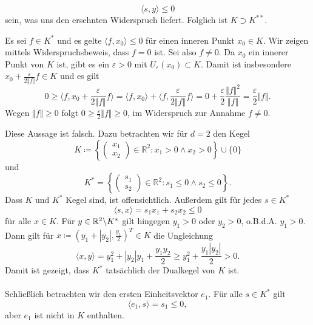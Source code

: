 \begin{compactenum}[(i)]
\begin{compactenum}
\begin{displaymath}
  \langle s,y\rangle \leq 0
 \end{displaymath}
 sein, was uns den ersehnten Widerspruch liefert. Folglich ist $K\supset K^{**}$.
 \\
 \end{compactenum}
 \item  Es sei $f\in K^*$ und es gelte $\langle f, x_0\rangle\leq 0$ für einen inneren Punkt $x_0\in K$. Wir zeigen mittels Widerspruchsbeweis, dass $f=0$ ist. Sei also $f\neq0$. Da $x_0$ ein innerer Punkt von $K$ 
 ist, gibt es ein $\varepsilon>0$ mit $U_\varepsilon(x_0)\subset K$. Damit ist insbesondere 
 $x_0+\frac{\varepsilon}{2\Vert f \Vert} f\in K$ und es gilt
 \begin{displaymath}
  0\geq \langle f,x_0+\frac{\varepsilon}{2\Vert f \Vert} f\rangle
  = \langle f,x_0\rangle+\langle f,\frac{\varepsilon}{2\Vert f \Vert} f\rangle
  =0+\frac{\varepsilon}{2} \frac{\Vert f\Vert^2}{\Vert f\Vert}=\frac{\varepsilon}{2} \Vert f\Vert.
 \end{displaymath}
Wegen $\Vert f\Vert\geq 0$ folgt $0\geq \frac{\varepsilon}{2} \Vert f\Vert\geq 0$, im Widerspruch zur Annahme $f\neq 0$. \\
 \item Diese Aussage ist falsch. Dazu betrachten wir für $d=2$ den Kegel
 \begin{displaymath}
  K\coloneqq\left\{\begin{pmatrix}x_1\\x_2\end{pmatrix}\in\mathbb R^2: x_1>0 \land x_2>0 \right\}\cup\{0\}
 \end{displaymath}
  und
  \begin{displaymath}
  K^*=\left\{\begin{pmatrix}s_1\\s_2\end{pmatrix}\in\mathbb R^2: s_1\leq 0 \land s_2\leq 0 \right\}.
 \end{displaymath}
 Dass $K$ und $K^*$ Kegel sind, ist offensichtlich. Außerdem gilt für jedes $s\in K^*$
 \begin{displaymath}
  \langle s,x\rangle =s_1x_1+s_2x_2\leq 0
 \end{displaymath}
 für alle $x\in K$. Für $y\in \mathbb{R}^2\backslash K^*$ gilt hingegen $y_1>0$ oder $y_2>0$, o.B.d.A. $y_1>0$. Dann gilt für $x\coloneqq(y_1+|y_2|,\frac{y_1}{2})^T\in K$ die Ungleichung
 \begin{displaymath}
  \langle x, y\rangle=y_1^2+|y_2|y_1+\frac{y_1y_2}{2} \geq y_1^2+\frac{y_1|y_2|}{2}>0.
 \end{displaymath}
 Damit ist gezeigt, dass $K^*$ tatsächlich der Dualkegel von $K$ ist. \\\\
Schließlich betrachten wir den ersten Einheitsvektor $e_1$. Für alle $s\in K^*$ gilt
  \begin{displaymath}
  \langle e_1, s\rangle=s_1 \leq 0,
 \end{displaymath}
aber $e_1$ ist nicht in $K$ enthalten.
\end{compactenum}
